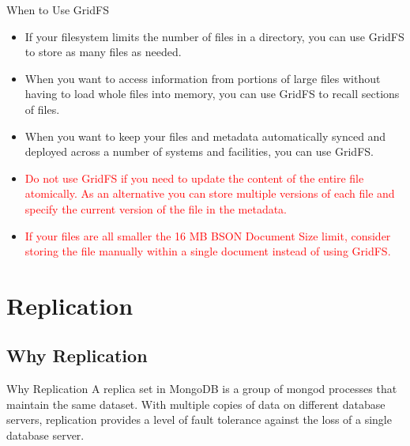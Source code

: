 \documentclass{beamer}
\begin{document}
\begin{frame}{When to Use GridFS}
    \begin{itemize}
        \item If your filesystem limits the number of files in a directory, you can use GridFS to store as many files as needed.
        \item When you want to access information from portions of large files without having to load whole files into memory, you can use GridFS to recall sections of files.
        \item When you want to keep your files and metadata automatically synced and deployed across a number of systems and facilities, you can use GridFS.
        \item \textcolor{red}{Do not use GridFS if you need to update the content of the entire file atomically. As an alternative you can store multiple versions of each file and specify the current version of the file in the metadata. }
        \item \textcolor{red}{If your files are all smaller the 16 MB BSON Document Size limit, consider storing the file manually within a single document instead of using GridFS.}
    \end{itemize}
\end{frame}

\section{Replication}
\subsection{Why Replication}
\begin{frame}{Why Replication}
    A replica set in MongoDB is a group of mongod processes that maintain the same dataset. With multiple copies of data on different database servers, replication provides a level of fault tolerance against the loss of a single database server.
\end{frame}
\end{document}
